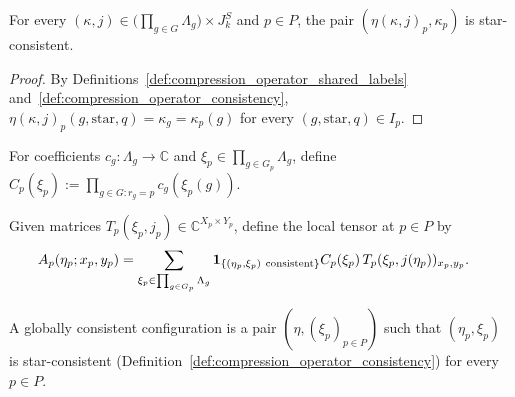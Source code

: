 \begin{lemma}
    \label{thm:compression_operator_shared_consistency}
    \leanok
    For every $(\kappa,j)\in\bigl(\prod_{g\in G}\Lambda_g\bigr)\times J_k^S$ and $p\in P$, the pair $(\eta(\kappa,j)_p,\kappa_p)$ is star-consistent.
\end{lemma}

\begin{proof}\leanok
    By Definitions~\ref{def:compression_operator_shared_labels} and~\ref{def:compression_operator_consistency}, $\eta(\kappa,j)_p(g,\mathrm{star},q)=\kappa_g=\kappa_p(g)$ for every $(g,\mathrm{star},q)\in I_p$.
\end{proof}

\begin{definition}
    \label{def:compression_operator_root_coefficients}
    \leanok
    For coefficients $c_g:\Lambda_g\to\mathbb C$ and $\xi_p\in\prod_{g\in G_p}\Lambda_g$, define $C_p(\xi_p):=\prod_{g\in G:r_g=p}c_g(\xi_p(g))$.
\end{definition}

\begin{definition}
    \label{def:compression_operator_local_tensor}
    \leanok
    Given matrices $T_p(\xi_p,j_p)\in\mathbb C^{X_p\times Y_p}$, define the local tensor at $p\in P$ by
    \begin{align}
        A_p(\eta_p;x_p,y_p)
         & =\sum_{\xi_p\in\prod_{g\in G_p}\Lambda_g}
        \mathbf1_{\{(\eta_p,\xi_p)\ {\rm consistent}\}}
        C_p(\xi_p)\,T_p(\xi_p,j(\eta_p))_{x_p,y_p}.
        \label{eq:compression_operator_local_tensor}
    \end{align}
\end{definition}

\begin{definition}
    \label{def:compression_operator_consistent_configs}
    \leanok
    A globally consistent configuration is a pair $(\eta,(\xi_p)_{p\in P})$ such that $(\eta_p,\xi_p)$ is star-consistent (Definition~\ref{def:compression_operator_consistency}) for every $p\in P$.
\end{definition}

